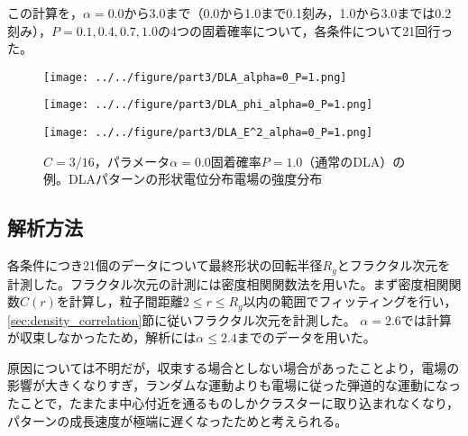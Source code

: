 \documentclass[autodetect-engine,dvi=dvipdfmx,a4paper,ja=standard,oneside,openany,11pt,draft]{bxjsbook}
\begin{document}
この計算を，$\alpha=0.0$から$3.0$まで（0.0から1.0まで0.1刻み，1.0から3.0までは0.2刻み），$P=0.1,0.4,0.7,1.0$の4つの固着確率について，各条件について21回行った。
\begin{figure}[htbp]
  \begin{minipage}{0.32\hsize}
    \subcaption{}
    \centering
    \texttt{[image: ../../figure/part3/DLA\_alpha=0\_P=1.png]}
    \label{fig:DLA_alpha_0_P_1}
  \end{minipage}
  \begin{minipage}{0.32\hsize}
    \subcaption{}
    \centering
    \texttt{[image: ../../figure/part3/DLA\_phi\_alpha=0\_P=1.png]}
    \label{fig:DLA_phi_alpha_0_P_1}
  \end{minipage}
  \begin{minipage}{0.32\hsize}
    \subcaption{}
    \centering
    \texttt{[image: ../../figure/part3/DLA\_E^2\_alpha=0\_P=1.png]}
    \label{fig:DLA_E_alpha_0_P_1}
  \end{minipage}
  \caption{$C=3/16$，パラメータ$\alpha=0.0$固着確率$P=1.0$（通常のDLA）の例。DLAパターンの形状電位分布電場の強度分布}
  \label{fig:DLA_ex}
\end{figure}
\subsection{解析方法}
各条件につき21個のデータについて最終形状の回転半径$R_g$とフラクタル次元を計測した。フラクタル次元の計測には密度相関関数法を用いた。まず密度相関関数$C(r)$を計算し，粒子間距離$2\leq r\leq R_g$以内の範囲でフィッティングを行い，\ref{sec:density_correlation}節に従いフラクタル次元を計測した。
$\alpha=2.6$では計算が収束しなかったため，解析には$\alpha\leq2.4$までのデータを用いた。

原因については不明だが，収束する場合としない場合があったことより，電場の影響が大きくなりすぎ，ランダムな運動よりも電場に従った弾道的な運動になったことで，たまたま中心付近を通るものしかクラスターに取り込まれなくなり，パターンの成長速度が極端に遅くなったためと考えられる。

\ifdraft{
  
  
}{}
\end{document}

